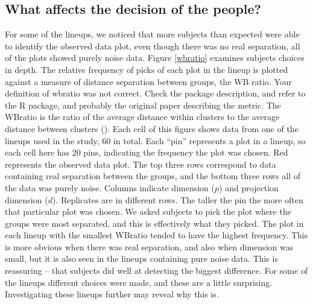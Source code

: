 \documentclass[12]{article}
\newcommand{\blue}{\color{blue}}
\begin{document}

\subsection{What affects the decision of the people?}

\normalsize

For some of the lineups, we noticed that more subjects than expected were able to identify the observed data plot, even though there was no real separation, all of the plots showed purely noise data. Figure \ref{wbratio} examines subjects choices in depth. The  relative frequency of picks of each plot in the lineup is plotted against a measure of distance separation between groups, the WB ratio. {\blue Your definition of wbratio was not correct. Check the package description, and refer to the R package, and probably the original paper describing the metric.}  The WBratio is the ratio of the average distance within clusters to the average distance between clusters (\cite{hennig:2010}). Each cell of this figure shows data from one of the lineups used in the study, 60 in total. Each ``pin'' represents a plot in a lineup, so each cell here has 20 pins, indicating the frequency the plot was chosen. Red represents the observed data plot. The top three rows correspond to data containing real separation between the groups, and the bottom three rows all of the data was purely noise. Columns indicate dimension ($p$) and projection dimension ($d$). Replicates are in different rows. The taller the pin the more often that particular plot was chosen. We asked subjects to pick the plot where the groups were most separated, and this is effectively what they picked. The plot in each lineup with the smallest WBratio tended to have the highest frequency. This is more obvious when there was real separation, and also when dimension was small, but it is also seen in the lineups containing pure noise data. This is reassuring -- that subjects did well at detecting the biggest difference.  For some of the lineups different choices were made, and these are a little surprising. Investigating these lineups further may reveal why this is. 
\end{document}
